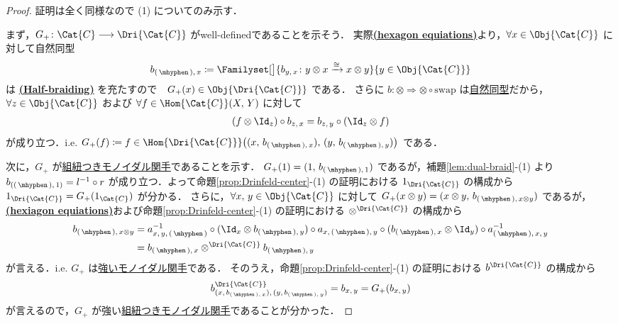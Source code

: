 \documentclass[TQFT_main]{subfiles}
\begin{document}
\begin{proof}
    証明は全く同様なので (1) についてのみ示す．

    まず，$G_+ \colon \Cat{C} \lto \Dri{\Cat{C}}$ がwell-definedであることを示そう．
    実際\hyperref[redef:braided-monoidal]{\textsf{\textbf{(hexagon equiations)}}}より，$\forall x \in \Obj{\Cat{C}}$ に対して自然同型
    \begin{align}
        b_{(\, \mhyphen \,),\, x} \coloneqq \Familyset[\big]{b_{y,\, x} \colon y \otimes x \xrightarrow{\cong} x \otimes y }{y \in \Obj{\Cat{C}}}
    \end{align}
    は \hyperref[def:Drinfeld-center]{\textsf{\textbf{(Half-braiding)}}} を充たすので　$G_+(x) \in \Obj{\Dri{\Cat{C}}}$ である．
    さらに $b \colon \otimes \Longrightarrow \otimes \circ \mathrm{swap}$ は\hyperref[def:nat]{自然同型}だから，
    $\forall z \in \Obj{\Cat{C}}$ および $\forall f \in \Hom{\Cat{C}} (X,\, Y)$ に対して
    \begin{align}
        \label{eq:nat-braiding}
        (f \otimes \Id_z) \circ b_{z,\, x} = b_{z,\, y} \circ (\Id_z \otimes f)
    \end{align}
    が成り立つ．i.e. $G_+(f) \coloneqq f \in \Hom{\Dri{\Cat{C}}} \bigl( (x,\, b_{(\, \mhyphen \,),\, x}),\, (y,\, b_{(\, \mhyphen \,),\, y}) \bigr)$ である．

    次に，$G_+$ が\hyperref[def:braided-monoidal-functor]{組紐つきモノイダル関手}であることを示す．
    $G_+(1) = (1,\, b_{(\, \mhyphen \,),\, 1})$ であるが，補題\ref{lem:dual-braid}-(1) より $b_{((\, \mhyphen \,),\, 1)} = l^{-1} \circ r$ が成り立つ．よって命題\ref{prop:Drinfeld-center}-(1) の証明における $1_{\Dri{\Cat{C}}}$ の構成から $1_{\Dri{\Cat{C}}} = G_+(1_{\Cat{C}})$ が分かる．
    さらに，$\forall x,\, y \in \Obj{\Cat{C}}$ に対して $G_+(x \otimes y) = (x \otimes y,\, b_{(\, \mhyphen \,),\, x \otimes y})$ であるが，\hyperref[redef:braided-monoidal]{\textsf{\textbf{(hexiagon equiations)}}}および命題\ref{prop:Drinfeld-center}-(1) の証明における $\otimes^{\Dri{\Cat{C}}}$ の構成から
    \begin{align}
        b_{(\, \mhyphen \,),\, x \otimes y}
        &= a^{-1}_{x,\, y,\, (\, \mhyphen \,)} \circ (\Id_x \otimes b_{(\, \mhyphen \,),\, y}) \circ a_{x,\, (\, \mhyphen \,),\, y} \circ (b_{(\, \mhyphen \,),\, x} \otimes \Id_y) \circ a^{-1}_{(\, \mhyphen \,),\, x,\, y} \\
        &= b_{(\, \mhyphen \,),\, x} \otimes^{\Dri{\Cat{C}}} b_{(\, \mhyphen \,),\, y}
    \end{align}
    が言える．i.e. $G_+$ は\hyperref[redef:monidal-functor]{強いモノイダル関手}である．
    そのうえ，命題\ref{prop:Drinfeld-center}-(1) の証明における $b^{\Dri{\Cat{C}}}$ の構成から
    \begin{align}
        b^{\Dri{\Cat{C}}}_{(x,\, b_{(\, \mhyphen \,),\, x}),\, (y,\, b_{(\, \mhyphen \,),\, y})} = b_{x,\, y} = G_+(b_{x,\, y})
    \end{align}
    が言えるので，$G_+$ が強い\hyperref[def:braided-monoidal-functor]{組紐つきモノイダル関手}であることが分かった．


\end{proof}
\end{document}
